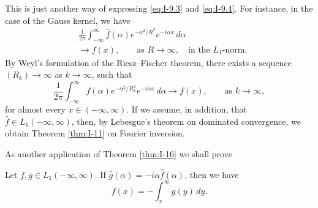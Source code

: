 This is just another way of expressing \eqref{eq:I-9.3} and \eqref{eq:I-9.4}. For instance, in the case of the Gauss kernel, we have
\begin{equation*}
\begin{aligned}
&\frac{1}{2\pi}  \int_{-\infty}^{\infty}\widehat f(\alpha)e^{-\alpha^{2}/R^{2}}e^{-i\alpha x}\,d\alpha\\
&\to f(x),  \qquad\text{as }R \to \infty,\quad\text{in the }L_1\text{-norm}.
\end{aligned}
\end{equation*}
By Weyl's formulation of the Riesz--Fischer theorem, there exists a sequence $(R_k)\to\infty$ as $k\to\infty$, such that
\begin{equation*}
\frac{1}{2\pi}\int_{-\infty}^{\infty}\widehat f(\alpha)e^{-\alpha^{2}/R_k^{2}}e^{-i\alpha x}\,d\alpha\to f(x),\qquad\text{as }k\to\infty,
\end{equation*}
for almost every $x\in(-\infty,\infty)$. If we assume, in addition, that $\widehat f\in L_1(-\infty,\infty)$, then, by Lebesgue's theorem on dominated convergence, we obtain Theorem \ref{thm:I-11} on Fourier inversion.

As another application of Theorem \ref{thm:I-16} we shall prove

\begin{theorem}\label{thm:I-17}
Let $f,g\in L_1(-\infty,\infty)$. If $\widehat g(\alpha)=-i\alpha\widehat f(\alpha)$, then we have
\begin{equation*}
f(x)=-\int_{x}^{\infty}g(y)\,dy.
\end{equation*}
\end{theorem}

